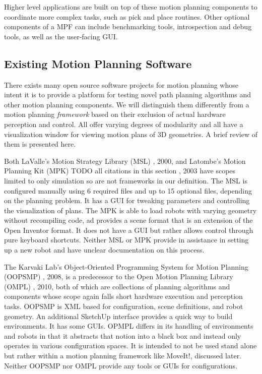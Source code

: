 \documentclass[10pt,journal,compsoc]{joser1}
\begin{document}
{Higher level applications are built on top of these motion planning components to coordinate more complex tasks, such as pick and place routines. Other optional components of a MPF can include benchmarking tools, introspection and debug tools, as well as the user-facing GUI.

\subsection{Existing Motion Planning Software}
\label{sec::existing}

There exists many open source software projects for motion planning whose intent it is to provide a platform for testing novel path planning algorithms and other motion planning components. We will distinguish them differently from a motion planning \textit{framework} based on their exclusion of actual hardware perception and control. All offer varying degrees of modularity and all have a visualization window for viewing motion plans of 3D geometries. A brief review of them is presented here.

Both LaValle's Motion Strategy Library (MSL) \cite{lavallemsl}, 2000, and Latombe's Motion Planning Kit (MPK) TODO all citations in this section \cite{}, 2003 have scopes limited to only simulation so are not frameworks in our definition. The MSL is configured manually using 6 required files and up to 15 optional files, depending on the planning problem. It has a GUI for tweaking parameters and controlling the visualization of plans. The MPK is able to load robots with varying geometry without recompiling code, ad provides a scene format that is an extension of the Open Inventor format. It does not have a GUI but rather allows control through pure keyboard shortcuts. Neither MSL or MPK provide in assistance in setting up a new robot and have unclear documentation on this process.

The Karvaki Lab's Object-Oriented Programming System for Motion Planning (OOPSMP) \cite{}, 2008, is a predecessor to the Open Motion Planning Library (OMPL) \cite{}, 2010, both of which are collections of planning algorithms and components whose scope again falls short hardware execution and perception tasks. OOPSMP is XML based for configuration, scene definitions, and robot geometry. An additional SketchUp interface provides a quick way to build environments. It has some GUIs. OPMPL differs in its handling of environments and robots in that it abstracts that notion into a black box and instead only operates in various configuration spaces. It is intended to not be used stand alone but rather within a motion planning framework like MoveIt!, discussed later. Neither OOPSMP nor OMPL provide any tools or GUIs for configurations.

}
\end{document}
